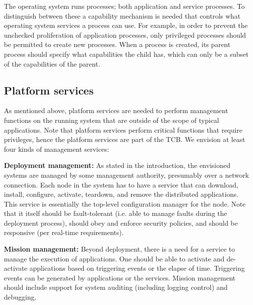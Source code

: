 The operating system runs processes; both application and service
processes. To distinguish between these a capability mechanism is
needed that controls what operating system services a process can
use. For example, in order to prevent the unchecked proliferation of
application processes, only privileged processes should be permitted
to create new processes. When a process is created, its parent process 
should specify what capabilities the child has, which can only be a subset of
the capabilities of the parent.

\vspace{-0.05in}
\subsection{Platform services}

As mentioned above, platform services are needed to perform management
functions on the running system that are outside of the scope of
typical applications. Note that platform services perform critical
functions that require privileges, hence the platform services are
part of the TCB. We envision at least four kinds of management
services:

  \textbf{Deployment management:} As stated in the introduction,
  the envisioned systems are managed by some management authority,
  presumably over a network connection. Each node in the system has to
  have a service that can download, install, configure, activate,
  teardown, and remove the distributed applications. This service is
  essentially the top-level configuration manager for the node. Note
  that it itself should be fault-tolerant (i.e. able to manage faults during
  the deployment process), should obey and enforce security policies,
  and should be responsive (per real-time requirements).

 \textbf{Mission management:} Beyond deployment, there is a need
  for a service to manage the execution of applications. One should be
  able to activate and de-activate applications based on triggering
  events or the elapse of time. Triggering events can be generated by
  applications or the services. Mission management should include support
  for system auditing (including logging control) and debugging.

